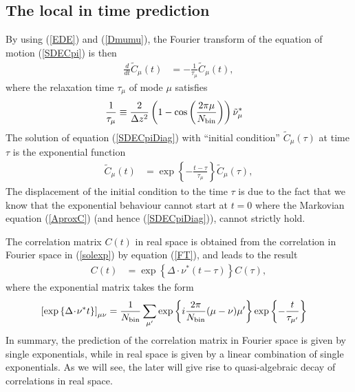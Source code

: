 \documentclass[b5paper,openright,10pt]{book}
\newcommand{\esc}{\!\cdot\!}
\begin{document}


\subsection{The local in time prediction}
By using (\ref{EDE})  and (\ref{Dmumu}), the Fourier  transform of the
equation of motion (\ref{SDECpi}) is then
\begin{align}
  \frac{d}{dt}\tilde{C}_{\mu}(t)&=-\frac{1}{\tau_\mu}\tilde{C}_\mu(t),
\label{SDECpiDiag}
\end{align}
where the relaxation time $\tau_\mu$ of mode $\mu$ satisfies
\begin{align}
 \frac{1}{\tau_\mu}&\equiv \frac{2}{\Delta z^2}
\left(1-\cos\left( \frac{2\pi \mu}{N_{\rm bin}}\right)\right)
\tilde{\nu}_\mu^*
\label{taumu}
\end{align}
The  solution of  equation  (\ref{SDECpiDiag})  with ``initial  condition''
$\tilde{C}_\mu(\tau)$ at time $\tau$ is the exponential function
\begin{align}
  \tilde{C}_\mu(t)&=\exp\left\{-\frac{t-\tau}{\tau_\mu}\right\}  \tilde{C}_\mu(\tau),
\label{solexp}
\end{align}
The displacement of the initial condition to the time $\tau$ is due to
the fact that  we know that the exponential behaviour  cannot start at
$t=0$  where   the  Markovian  equation  (\ref{AproxC})   (and  hence
(\ref{SDECpiDiag})), cannot strictly hold.

The correlation matrix $C(t)$ in real space is obtained from the correlation in Fourier space in (\ref{solexp}) by equation (\ref{FT}), and leads to the result
\begin{align}
  C(t)&=\exp\left\{\Delta\esc \nu^* (t-\tau) \right\}C(\tau),
\label{Cmunut}
\end{align}
where the exponential matrix takes the form
\begin{align}
\left[\exp\left\{\Delta\esc \nu^* t \right\}\right]_{\mu\nu}
&=\frac{1}{N_{\rm bin}}\sum_{\mu'}\exp\left\{i\frac{2\pi}{N_{\rm bin}}(\mu-\nu)\mu'\right\}
\exp\left\{-\frac{t}{\tau_{\mu'}}\right\}
\label{ExpMat}
\end{align}
In summary, the prediction of  the correlation matrix in Fourier space
is given  by single exponentials,  while in real  space is given  by a
linear combination of  single exponentials. As we will  see, the later
will give rise to quasi-algebraic decay of correlations in real space.
\end{document}
